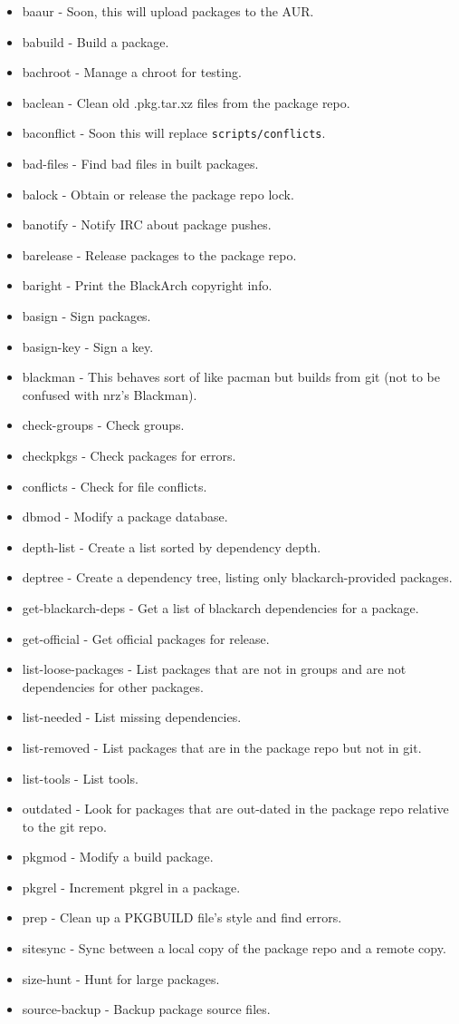\documentclass[a4paper, oneside, 11pt]{book}
\begin{document}
\begin{itemize}
\item baaur - Soon, this will upload packages to the AUR.
\item babuild - Build a package.
\item bachroot - Manage a chroot for testing.
\item baclean - Clean old .pkg.tar.xz files from the package repo.
\item baconflict - Soon this will replace \verb|scripts/conflicts|.
\item bad-files - Find bad files in built packages.
\item balock - Obtain or release the package repo lock.
\item banotify - Notify IRC about package pushes.
\item barelease - Release packages to the package repo.
\item baright - Print the BlackArch copyright info.
\item basign - Sign packages.
\item basign-key - Sign a key.
\item blackman - This behaves sort of like pacman but builds from git (not to be
    confused with nrz's Blackman).
\item check-groups - Check groups.
\item checkpkgs - Check packages for errors.
\item conflicts - Check for file conflicts.
\item dbmod - Modify a package database.
\item depth-list - Create a list sorted by dependency depth.
\item deptree - Create a dependency tree, listing only blackarch-provided packages.
\item get-blackarch-deps - Get a list of blackarch dependencies for a package.
\item get-official - Get official packages for release.
\item list-loose-packages - List packages that are not in groups and are not
    dependencies for other packages.
\item list-needed - List missing dependencies.
\item list-removed - List packages that are in the package repo but not in git.
\item list-tools - List tools.
\item outdated - Look for packages that are out-dated in the package repo
    relative to the git repo.
\item pkgmod - Modify a build package.
\item pkgrel - Increment pkgrel in a package.
\item prep - Clean up a PKGBUILD file's style and find errors.
\item sitesync - Sync between a local copy of the package repo and a remote copy.
\item size-hunt - Hunt for large packages.
\item source-backup - Backup package source files.
\end{itemize}
\end{document}
